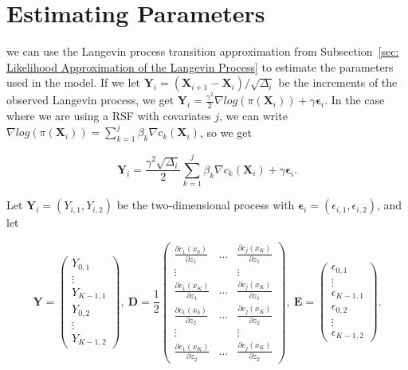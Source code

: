 \section{Estimating Parameters}
\label{sec: estimating parameters}
we can use the Langevin process transition approximation from Subsection~\ref{sec: Likelihood Approximation of the Langevin Process} to estimate the parameters used in the model. If we let $\textbf{Y}_i = (\textbf{X}_{i+1} - \textbf{X}_i)/\sqrt{\Delta_i}$ be the increments of the observed Langevin process, we get $\textbf{Y}_i = \frac{\gamma^2}{2}\nabla log(\pi(\textbf{X}_i)) + \gamma \bm \epsilon_i$. In the case where we are using a RSF with covariates $j$, we can write $\nabla log(\pi(\textbf{X}_i)) = \sum_{k = 1}^j \beta_k \nabla c_k(\textbf{X}_i)$, so we get

$$
    \textbf{Y}_i = \frac{\gamma^2 \sqrt{\Delta_i}}{2}\sum_{k = 1}^j \beta_k \nabla c_k(\textbf{X}_i) + \gamma \bm \epsilon_i.
$$

Let $\textbf{Y}_i = (Y_{i,1}, Y_{i,2})$ be the two-dimensional process with $\bm \epsilon_i =(\epsilon_{i,1}, \epsilon_{i,2})$, and let

$$
    \mathbf{Y} = \begin{pmatrix}
        Y_{0,1} \\
        \vdots \\
        Y_{K-1,1}\\
        Y_{0,2}\\
        \vdots\\
        Y_{K-1,2}
    \end{pmatrix} , \    
    \mathbf{D} = \frac{1}{2} 
    \begin{pmatrix}
        \frac{\partial c_1(x_0)}{\partial z_1} & \dots & \frac{\partial c_j(x_K)}{\partial z_1} \\
        \vdots & & \vdots \\
        \frac{\partial c_1(x_K)}{\partial z_1} & \dots & \frac{\partial c_j(x_K)}{\partial z_1} \\
        \frac{\partial c_1(x_0)}{\partial z_2} & \dots & \frac{\partial c_j(x_K)}{\partial z_2} \\
        \vdots & & \vdots \\
        \frac{\partial c_1(x_K)}{\partial z_2} & \dots & \frac{\partial c_j(x_K)}{\partial z_2}
    \end{pmatrix} , \
    \mathbf{E} =\begin{pmatrix}
        \epsilon_{0,1} \\
        \vdots \\
        \epsilon_{K-1,1}\\
        \epsilon_{0,2}\\
        \vdots\\
        \epsilon_{K-1,2}
    \end{pmatrix}.
$$


